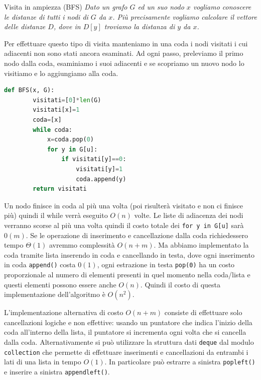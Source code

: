 \begin{Algoritmo}{Visita in ampiezza (BFS)}{}
    \textit{Dato un grafo $G$ ed un suo nodo $x$ vogliamo conoscere le distanze di tutti i nodi di $G$ da $x$. Più precisamente vogliamo calcolare il vettore delle distanze $D$, dove in $D[y]$ troviamo la distanza di $y$ da $x$.}

    Per effettuare questo tipo di visita manteniamo in una coda i nodi visitati i cui adiacenti non sono stati ancora esaminati. Ad ogni passo, preleviamo il primo nodo dalla coda, esaminiamo i suoi adiacenti e se scopriamo un nuovo nodo lo visitiamo e lo aggiungiamo alla coda.

    \begin{lstlisting}[language=Python]
    def BFS(x, G):
        visitati=[0]*len(G)
        visitati[x]=1
        coda=[x]
        while coda:
            x=coda.pop(0)
            for y in G[u]:
                if visitati[y]==0:
                    visitati[y]=1
                    coda.append(y)
        return visitati
    \end{lstlisting}

    Un nodo finisce in coda al più una volta (poi risulterà visitato e non ci finisce più) quindi il while verrà eseguito $O(n)$ volte. Le liste di adiacenza dei nodi verranno scorse al più una volta quindi il costo totale dei \verb|for y in G[u]| sarà $0(m)$. Se le operazione di inserimento e cancellazione dalla coda richiedessero tempo $\Theta(1)$ avremmo complessità $O(n + m)$. Ma abbiamo implementato la coda tramite lista inserendo in coda e cancellando in testa, dove ogni inserimento in coda \verb|append()| costa $0(1)$, ogni estrazione in testa \verb|pop(0)| ha un costo proporzionale al numero di elementi presenti in quel momento nella coda/lista e questi elementi possono essere anche $O(n)$. Quindi il costo di questa implementazione dell'algoritmo è $O(n^2)$.

    L'implementazione alternativa di costo $O(n+m)$ consiste di effettuare solo cancellazioni logiche e non effettive: usando un puntatore che indica l'inizio della coda all'interno della lista, il puntatore si incrementa ogni volta che si cancella dalla coda. Alternativamente si può utilizzare la struttura dati \verb|deque| dal modulo \verb|collection| che permette di effettuare inserimenti e cancellazioni da entrambi i lati di una lista in tempo $O(1)$. In particolare può estrarre a sinistra \verb|popleft()| e inserire a sinistra \verb|appendleft()|.


\end{Algoritmo}
